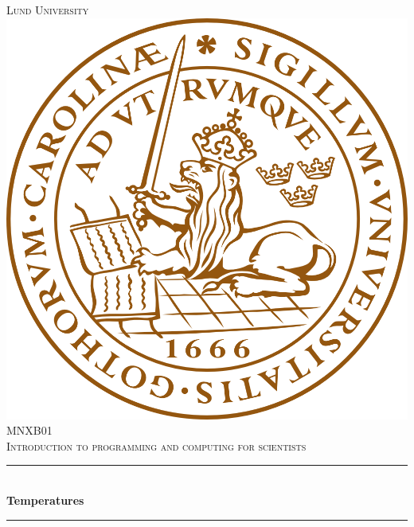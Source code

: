 \begin{titlepage}

\newcommand{\HRule}{\rule{\linewidth}{0.5mm}} %

\center %
 

\textsc{\LARGE Lund University}\\[1.5cm] %

\vspace{-0.4cm}
\includegraphics[scale=0.7]{logo.png}\\[1cm] %

\textsc{\Large MNXB01}\\[0.5cm] %
\textsc{\large Introduction to programming and computing for scientists}\\[0.5cm] %



\HRule \\[0.4cm]
{ \huge \bfseries Temperatures}\\[0.4cm] %
\HRule \\[1.5cm]
 




\end{titlepage}
